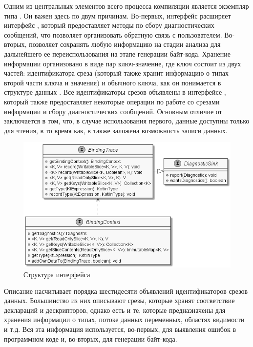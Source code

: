 Одним из центральных элементов всего процесса компиляции является экземпляр типа . Он важен здесь по двум причинам. Во-первых, интерфейс  расширяет интерфейс , который предоставляет методы по сбору диагностических сообщений, что позволяет организовать обратную связь с пользователем. Во-вторых,  позволяет сохранять любую информацию на стадии анализа для дальнейшего ее переиспользования на этапе генерации байт-кода. Хранение информации организовано в виде пар ключ-значение, где ключ состоит из двух частей: идентификатора среза (который также хранит информацию о типах второй части ключа и значения) и обычного ключа, как он понимается в структуре данных . Все идентификаторы срезов объявлены в интерфейсе , который также предоставляет некоторые операции по работе со срезами информации и сбору диагностических сообщений. Основным отличие  от  заключается в том, что, в случае использования первого, данные доступны только для чтения, в то время как, в  также заложена возможность записи данных. 

\begin{figure}[htbp]
    \centering
    \includegraphics[width=\textwidth]{resources/06/04_binding_context.png}
    \caption{Структура интерфейса }
    \label{fig05:binding-trace-scheme}
\end{figure}

Описание  насчитывает порядка шестидесяти объявлений идентификаторов срезов данных. Большинство из них описывают срезы, которые хранят соответствие деклараций и дескрипторов, однако есть и те, которые предназначены для хранения информации о типах, потоке данных переменных, областях видимости и т.д. Вся эта информация используется, во-первых, для выявления ошибок в программном коде и, во-вторых, для генерации байт-кода.

